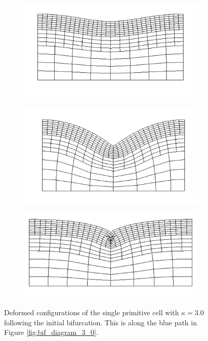 \documentclass[11pt]{report}
\begin{document}
 \begin{figure}[!htb]
	\begin{subfigure}[b]{0.33\textwidth}
		\includegraphics[width=\textwidth]{mesh/mesh_3_0_1_low}
	\end{subfigure}
	\begin{subfigure}[b]{0.33\textwidth}
		\includegraphics[width=\textwidth]{mesh/mesh_3_0_1_med}
	\end{subfigure}
    \begin{subfigure}[b]{0.33\textwidth}
		\includegraphics[width=\textwidth]{mesh/mesh_3_0_1_high}
	\end{subfigure}
	\captionsetup{format=hang}
	\caption{Deformed configurations of the single primitive cell with $\kappa = 3.0$ following the initial bifurcation. This is along the blue path in Figure \ref{fig:bif_diagram_3_0}.}
    \label{fig:mesh_3_0_1}
\end{figure}
\end{document}
